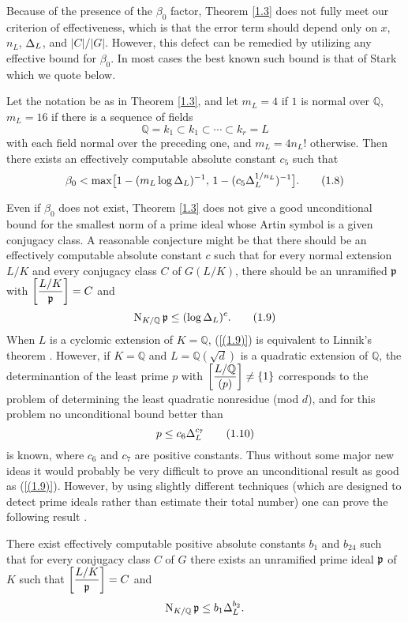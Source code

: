 \documentclass[./main]{subfiles}
\begin{document}
Because of the presence of the $\beta_0$ factor, Theorem \ref{1.3} does not fully meet our criterion of effectiveness, which is that the error term should depend only on $x$, $n_L$, $\Delta_L$, and $|C|/|G|$. However, this defect can be remedied by utilizing any effective bound for $\beta_0$. In most cases the best known such bound is that of Stark \cite[p.148]{13-Stark1974} which we quote below.

\begin{theorem}\label{1.4}
Let the notation be as in Theorem \ref{1.3}, and let $m_L = 4$ if $1$ is normal over $\mathbb Q$, $m_L = 16$ if there is a sequence of fields \[\mathbb Q = k_1 \subset k_1 \subset \cdots \subset k_r = L\] with each field normal over the preceding one, and $m_L = 4n_L!$ otherwise. Then there exists an effectively computable absolute constant $c_5$ such that
\[ \beta_0 < \max \bigl[1- (m_L\log\Delta_L)^{-1},\, 1-(c_5\Delta_L^{1/n_L})^{-1}\bigr]. \tag{1.8}\label{(1.8)} \]
\end{theorem}

Even if $\beta_0$ does not exist, Theorem \ref{1.3} does not give a good unconditional bound for the smallest norm of a prime ideal whose Artin symbol is a given conjugacy class. A reasonable conjecture might be that there should be an effectively computable absolute constant $c$ such that for every normal extension $L/K$ and every conjugacy class $C$ of $G(L/K)$, there should be an unramified $\mathfrak{p}$ with $\bigg[\dfrac{L/K}{\mathfrak{p}}\bigg] = C$ and 
\[ \operatorname{N}_{K/\mathbb Q}\mathfrak{p} \le (\log \Delta_L)^c. \tag{1.9}\label{(1.9)} \]
When $L$ is a cyclomic extension of $K = \mathbb Q$, (\ref{(1.9)}) is equivalent to Linnik's theorem \cite[p.39]{1-Bombieri1974}. However, if $K = \mathbb Q$ and $L = \mathbb Q(\sqrt{d})$ is a quadratic extension of $\mathbb Q$, the determinantion of the least prime $p$ with $\bigg[\dfrac{L/\mathbb Q}{(p)}\bigg] \ne \{1\}$ corresponds to the problem of determining the least quadratic nonresidue (mod $d$), and for this problem no unconditional bound better than
\[ p \le c_6 \Delta_L^{c_7} \tag{1.10}\label{(1.10)} \]
is known, where $c_6$ and $c_7$ are positive constants. Thus without some major new ideas it would probably be very difficult to prove an unconditional result as good as (\ref{(1.9)}). However, by using slightly different techniques (which are designed to detect prime ideals rather than estimate their total number) one can prove the following result \cite{7-lagarias1979}.

\begin{theorem*}
There exist effectively computable positive absolute constants $b_1$ and $b_24$ such that for every conjugacy class $C$ of $G$ there exists an unramified prime ideal $\mathfrak{p}$ of $K$ such that $\bigg[\dfrac{L/K}{\mathfrak{p}}\bigg] = C$ and
\[ \operatorname{N}_{K/\mathbb{Q}} \mathfrak{p} \le b_1 \Delta_L^{b_2}. \]
\end{theorem*}
\end{document}
